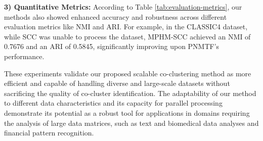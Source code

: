 \textbf{3) Quantitative Metrics:} According to Table \ref{tab:evaluation-metrics}, our methods also showed enhanced accuracy and robustness across different evaluation metrics like NMI and ARI. For example, in the CLASSIC4 dataset, while SCC was unable to process the dataset, MPHM-SCC achieved an NMI of 0.7676 and an ARI of 0.5845, significantly improving upon PNMTF's performance.

These experiments validate our proposed scalable co-clustering method as more efficient and capable of handling diverse and large-scale datasets without sacrificing the quality of co-cluster identification. The adaptability of our method to different data characteristics and its capacity for parallel processing demonstrate its potential as a robust tool for applications in domains requiring the analysis of large data matrices, such as text and biomedical data analyses and financial pattern recognition.
 